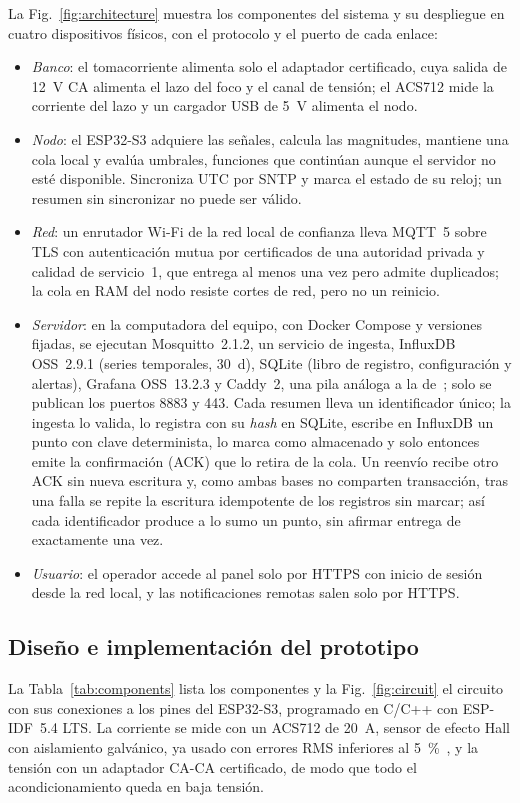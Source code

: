 La Fig.~\ref{fig:architecture} muestra los componentes del sistema y su despliegue en cuatro dispositivos físicos, con el protocolo y el puerto de cada enlace:
\begin{itemize}
  \item \emph{Banco}: el tomacorriente alimenta solo el adaptador certificado, cuya salida de \SI{12}{V} CA alimenta el lazo del foco y el canal de tensión; el ACS712 mide la corriente del lazo y un cargador USB de \SI{5}{V} alimenta el nodo.
  \item \emph{Nodo}: el ESP32-S3 adquiere las señales, calcula las magnitudes, mantiene una cola local y evalúa umbrales, funciones que continúan aunque el servidor no esté disponible.
  Sincroniza UTC por SNTP y marca el estado de su reloj; un resumen sin sincronizar no puede ser válido.
  \item \emph{Red}: un enrutador Wi-Fi de la red local de confianza lleva MQTT~5 sobre TLS con autenticación mutua por certificados de una autoridad privada y calidad de servicio~1, que entrega al menos una vez pero admite duplicados; la cola en RAM del nodo resiste cortes de red, pero no un reinicio.
  \item \emph{Servidor}: en la computadora del equipo, con Docker Compose y versiones fijadas, se ejecutan Mosquitto~2.1.2, un servicio de ingesta, InfluxDB OSS~2.9.1 (series temporales, \SI{30}{d}), SQLite (libro de registro, configuración y alertas), Grafana OSS~13.2.3 y Caddy~2, una pila análoga a la de~\cite{desousa2026smartmeter}; solo se publican los puertos 8883 y 443.
  Cada resumen lleva un identificador único; la ingesta lo valida, lo registra con su \textit{hash} en SQLite, escribe en InfluxDB un punto con clave determinista, lo marca como almacenado y solo entonces emite la confirmación (ACK) que lo retira de la cola.
  Un reenvío recibe otro ACK sin nueva escritura y, como ambas bases no comparten transacción, tras una falla se repite la escritura idempotente de los registros sin marcar; así cada identificador produce a lo sumo un punto, sin afirmar entrega de exactamente una vez.
  \item \emph{Usuario}: el operador accede al panel solo por HTTPS con inicio de sesión desde la red local, y las notificaciones remotas salen solo por HTTPS.
\end{itemize}

\subsection{Diseño e implementación del prototipo}
\label{sec:prototype}
La Tabla~\ref{tab:components} lista los componentes y la Fig.~\ref{fig:circuit} el circuito con sus conexiones a los pines del ESP32-S3, programado en C/C++ con ESP-IDF~5.4 LTS.
La corriente se mide con un ACS712 de \SI{20}{A}, sensor de efecto Hall con aislamiento galvánico, ya usado con errores RMS inferiores al \SI{5}{\percent}~\cite{marin2026rmsbenchmark}, y la tensión con un adaptador CA-CA certificado, de modo que todo el acondicionamiento queda en baja tensión.

